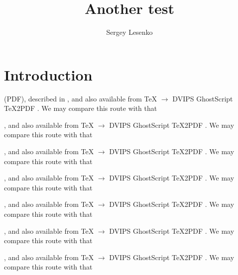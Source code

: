 \documentclass[pdftex]{article}
\begin{document}
\title{Another test}
\author{Sergey Lesenko}
\maketitle

\section{Introduction}
(PDF), described in
\cite{Adobe,Deutsch}, and also available from
\TeX{} $\longrightarrow$ DVIPS\cite{Rokicki} 
GhostScript\cite{Deutsch}
TeX2PDF\cite{Sojka}
\cite{Haralambous:TB16-2-162}.  We may compare this route with that

\citeyear{Adobe}, and also available from
\TeX{} $\longrightarrow$ DVIPS\citeyear{Rokicki} 
GhostScript\citeyear{Deutsch}
TeX2PDF\citeyear{Sojka}
\citeyear{Haralambous:TB16-2-162}.  We may compare this route with that

\citeauthor{Adobe}, and also available from
\TeX{} $\longrightarrow$ DVIPS\citeauthor{Rokicki} 
GhostScript\citeauthor{Deutsch}
TeX2PDF\citeauthor{Sojka}
\citeauthor{Haralambous:TB16-2-162}.  We may compare this route with that

, and also available from
\TeX{} $\longrightarrow$ DVIPS 
GhostScript
TeX2PDF
.  We may compare this route with that

\citet{Adobe}, and also available from
\TeX{} $\longrightarrow$ DVIPS\citet{Rokicki} 
GhostScript\citet{Deutsch}
TeX2PDF\citet{Sojka}
\citet{Haralambous:TB16-2-162}.  We may compare this route with that

\citealt{Adobe}, and also available from
\TeX{} $\longrightarrow$ DVIPS\citealt{Rokicki} 
GhostScript\citealt{Deutsch}
TeX2PDF\citealt{Sojka}
\citealt{Haralambous:TB16-2-162}.  We may compare this route with that

\cite*{Adobe}, and also available from
\TeX{} $\longrightarrow$ DVIPS\cite*{Rokicki} 
GhostScript\cite*{Deutsch}
TeX2PDF\cite*{Sojka}
\cite*{Haralambous:TB16-2-162}.  We may compare this route with that


\end{document}
